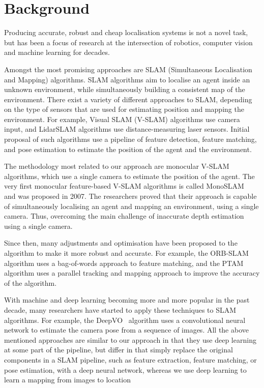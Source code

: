 \documentclass[a4paper]{article}
\begin{document}

  \section{Background} %
  \label{sec:background}


  Producing accurate, robust and cheap localisation systems is not a novel task,
  but has been a focus of research at the intersection of robotics, computer
  vision and machine learning for decades.

  Amongst the most promising approaches are SLAM (Simultaneous Localisation and
  Mapping) algorithms. SLAM algorithms aim to localise an agent inside an
  unknown environment, while simultaneously building a consistent map of the
  environment. There exist a variety of different approaches to SLAM, depending
  on the type of sensors that are used for estimating position and mapping the
  environment. For example, Visual SLAM (V-SLAM) algorithms use camera input,
  and LidarSLAM algorithms use distance-measuring laser sensors.
  Initial proposal of such algorithms use a pipeline of feature detection, 
  feature matching, and pose estimation to estimate the position of the agent
  and the environment. 

  The methodology most related to our approach are monocular V-SLAM algorithms,
  which use a single camera to estimate the position of the agent. The very
  first monocular feature-based V-SLAM algorithms is called
  MonoSLAM~\cite{mono-slam} and was proposed in 2007. The researchers proved
  that their approach is capable of simultaneously localising an agent and
  mapping an environment, using a single camera. Thus, overcoming the main
  challenge of inaccurate depth estimation using a single camera.

  Since then, many adjustments and optimisation have been proposed to the
  algorithm to make it more robust and accurate. For example, the
  ORB-SLAM~\cite{orb-slam} algorithm uses a bag-of-words approach to feature
  matching, and the PTAM~\cite{ptam} algorithm uses a parallel tracking and
  mapping approach to improve the accuracy of the algorithm. 

  With machine and deep learning becoming more and more popular in the past
  decade, many researchers have started to apply these techniques to SLAM
  algorithms. For example, the DeepVO~\cite{deep-vo} algorithm uses a
  convolutional neural network to estimate the camera pose from a sequence of
  images. All the above mentioned approaches are similar to our approach in that
  they use deep learning at some part of the pipeline, but differ in that simply
  replace the original components in a SLAM pipeline, such as feature
  extraction, feature matching, or pose estimation, with a deep neural network,
  whereas we use deep learning to learn a mapping from images to location
  
\end{document}
